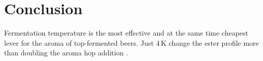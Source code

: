 \chapter{Conclusion}
Fermentation temperature is the most effective and at the same time cheapest lever for the aroma
of top-fermented beers. Just 4\,K change the ester profile more than doubling the aroma
hop addition \citep{hopfner2019reinheit}.
